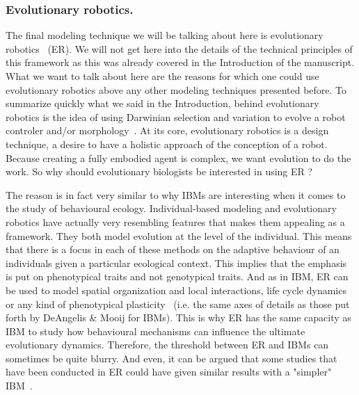     \subsubsection{Evolutionary robotics.} The final modeling technique we will be talking about here is evolutionary robotics~\cite{Nolfi2000, Doncieux2015a} (ER). We will not get here into the details of the technical principles of this framework as this was already covered in the Introduction of the manuscript. What we want to talk about here are the reasons for which one could use evolutionary robotics above any other modeling techniques presented before. To summarize quickly what we said in the Introduction, behind evolutionary robotics is the idea of using Darwinian selection and variation to evolve a robot controler and/or morphology~\cite{Floreano2010, Doncieux2014}. At its core, evolutionary robotics is a design technique, a desire to have a holistic approach of the conception of a robot. Because creating a fully embodied agent is complex, we want evolution to do the work. So why should evolutionary biologists be interested in using ER ?

    The reason is in fact very similar to why IBMs are interesting when it comes to the study of behavioural ecology. Individual-based modeling and evolutionary robotics have actually very resembling features that makes them appealing as a framework. They both model evolution at the level of the individual. This means that there is a focus in each of these methods on the adaptive behaviour of an individuals given a particular ecological context. This implies that the emphasis is put on phenotypical traits and not genotypical traits. And as in IBM, ER can be used to model spatial organization and local interactions, life cycle dynamics or any kind of phenotypical plasticity~\cite{Mitri2012} (i.e. the same axes of details as those put forth by DeAngelis & Mooij for IBMs). This is why ER has the same capacity as IBM to study how behavioural mechanisms can influence the ultimate evolutionary dynamics. Therefore, the threshold between ER and IBMs can sometimes be quite blurry. And even, it can be argued that some studies that have been conducted in ER could have given similar results with a "simpler" IBM~\cite{Mitri2012}.

